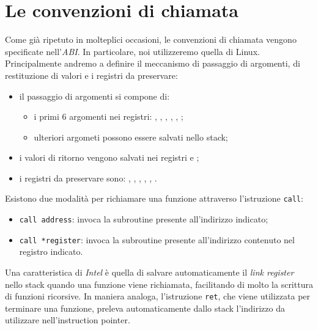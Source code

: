 \documentclass[class=book, crop=false, oneside]{standalone}
\begin{document}
\section{Le convenzioni di chiamata}
Come già ripetuto in molteplici occasioni, le convenzioni di chiamata vengono specificate nell'\emph{ABI}. In particolare, noi utilizzeremo quella di Linux. Principalmente andremo a definire il meccanismo di passaggio di argomenti, di restituzione di valori e i registri da preservare:
\begin{itemize}
	\item il passaggio di argomenti si compone di:
	\begin{itemize}
		\item i primi \(6\) argomenti nei registri: , , , , , ;
		\item ulteriori argometi possono essere salvati nello stack;
	\end{itemize}
	\item i valori di ritorno vengono salvati nei registri  e ;
	\item i registri da preservare sono: , , , , , .
\end{itemize}

Esistono due modalità per richiamare una funzione attraverso l'istruzione \texttt{call}:
\begin{itemize}
	\item \texttt{call address}: invoca la subroutine presente all'indirizzo indicato;
	\item \texttt{call *register}: invoca la subroutine presente all'indirizzo contenuto nel registro indicato.
\end{itemize}
Una caratteristica di \emph{Intel} è quella di salvare automaticamente il \emph{link register} nello stack quando una funzione viene richiamata, facilitando di molto la scrittura di funzioni ricorsive. In maniera analoga, l'istruzione \texttt{ret}, che viene utilizzata per terminare una funzione, preleva automaticamente dallo stack l'indirizzo da utilizzare nell'instruction pointer.
\end{document}
